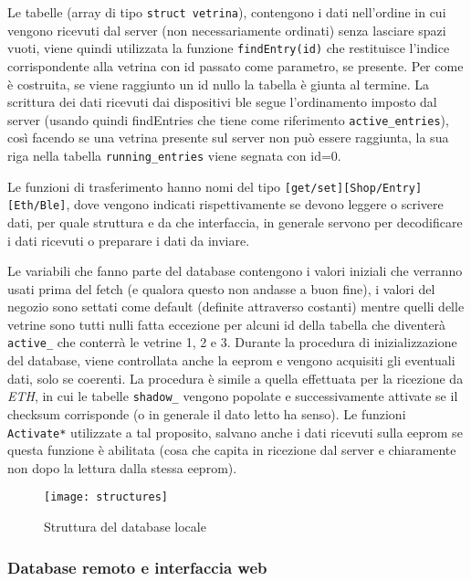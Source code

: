 Le tabelle (array di tipo \texttt{struct vetrina}), contengono i dati nell'ordine in cui vengono ricevuti dal server (non necessariamente ordinati) senza lasciare spazi vuoti, viene quindi utilizzata la funzione \texttt{findEntry(id)} che restituisce l'indice corrispondente alla vetrina con id passato come parametro, se presente. Per come \`e costruita, se viene raggiunto un id nullo la tabella \`e giunta al termine. La scrittura dei dati ricevuti dai dispositivi ble segue l'ordinamento imposto dal server (usando quindi findEntries che tiene come riferimento \texttt{active\_entries}), cos\`i facendo se una vetrina presente sul server non pu\`o essere raggiunta, la sua riga nella tabella \texttt{running\_entries} viene segnata con id=0.

Le funzioni di trasferimento hanno nomi del tipo \texttt{[get/set][Shop/Entry][Eth/Ble]}, dove vengono indicati rispettivamente se devono leggere o scrivere dati, per quale struttura e da che interfaccia, in generale servono per decodificare i dati ricevuti o preparare i dati da inviare.

Le variabili che fanno parte del database contengono i valori iniziali che verranno usati prima del fetch (e qualora questo non andasse a buon fine), i valori del negozio sono settati come default (definite attraverso costanti) mentre quelli delle vetrine sono tutti nulli fatta eccezione per alcuni id della tabella che diventer\`a \texttt{active\_} che conterr\`a le vetrine 1, 2 e 3. Durante la procedura di inizializzazione del database, viene controllata anche la eeprom e vengono acquisiti gli eventuali dati, solo se coerenti. La procedura \`e simile a quella effettuata per la ricezione da \textit{ETH}, in cui le tabelle \texttt{shadow\_} vengono popolate e successivamente attivate se il checksum corrisponde (o in generale il dato letto ha senso). Le funzioni \texttt{Activate*} utilizzate a tal proposito, salvano anche i dati ricevuti sulla eeprom se questa funzione \`e abilitata (cosa che capita in ricezione dal server e chiaramente non dopo la lettura dalla stessa eeprom).

\begin{figure}[h!]
	\texttt{[image: structures]}
  \caption{Struttura del database locale}
\end{figure}

\subsubsection{Database remoto e interfaccia web}

